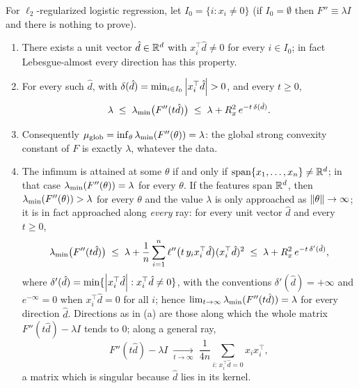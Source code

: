 \begin{proposition}\label{prop:B2-global}
For $\ell_2$-regularized logistic regression, let $I_0=\{i:x_i\neq0\}$ (if $I_0=\emptyset$ then $F''\equiv\lambda I$ and there is nothing to prove).
\begin{enumerate}[label=(\alph*)]
\item There exists a unit vector $\hat d\in\mathbb{R}^d$ with $x_i^\top\hat d\neq0$ for every $i\in I_0$; in fact Lebesgue-almost
every direction has this property.
\item For every such $\hat d$, with $\delta(\hat d)=\min_{i\in I_0}\abs{x_i^\top\hat d}>0$, and every $t\ge0$,
\begin{equation}\label{ineq:global-escape}
\lambda\;\le\;\lambda_{\min}\big(F''(t\hat d)\big)\;\le\;\lambda+R_x^2\,e^{-t\,\delta(\hat d)} .
\end{equation}
\item Consequently $\mu_{\mathrm{glob}}=\inf_\theta\lambda_{\min}(F''(\theta))=\lambda$: the global strong convexity
constant of $F$ is exactly $\lambda$, whatever the data.
\item The infimum is attained at some $\theta$ if and only if $\operatorname{span}\{x_1,\dots,x_n\}\neq\mathbb{R}^d$;
in that case $\lambda_{\min}(F''(\theta))=\lambda$ for every $\theta$. If the features span $\mathbb{R}^d$, then
$\lambda_{\min}(F''(\theta))>\lambda$ for every $\theta$ and the value $\lambda$ is only approached as
$\left\|\theta\right\|\to\infty$; it is in fact approached along \emph{every} ray: for every unit vector $\hat d$ and every $t\ge0$,
\begin{equation}\label{ineq:global-ray}
\lambda_{\min}\big(F''(t\hat d)\big)\;\le\;\lambda+\frac1n\sum_{i=1}^n\ell''\big(t\,y_ix_i^\top\hat d\big)(x_i^\top\hat d)^2\;\le\;\lambda+R_x^2\,e^{-t\,\delta'(\hat d)},
\end{equation}
where $\delta'(\hat d)=\min\{\left|x_i^\top\hat d\right|:x_i^\top\hat d\neq0\}$, with the conventions $\delta'(\hat d)=+\infty$ and
$e^{-\infty}=0$ when $x_i^\top\hat d=0$ for all $i$; hence $\lim_{t\to\infty}\lambda_{\min}(F''(t\hat d))=\lambda$ for every
direction $\hat d$. Directions as in (a) are those along which the whole matrix $F''(t\hat d)-\lambda I$ tends to $0$;
along a general ray,
\[
F''(t\hat d)-\lambda I\;\xrightarrow[t\to\infty]{}\;\frac1{4n}\sum_{i:\,x_i^\top\hat d=0}x_ix_i^\top ,
\]
a matrix which is singular because $\hat d$ lies in its kernel.
\end{enumerate}
\end{proposition}

